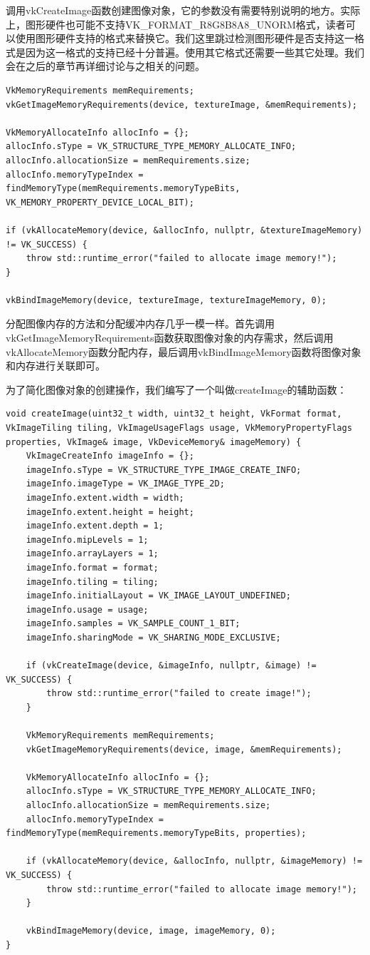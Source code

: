 \documentclass{ctexart}
\begin{document}
调用vkCreateImage函数创建图像对象，它的参数没有需要特别说明的地方。实际上，图形硬件也可能不支持VK\_FORMAT\_R8G8B8A8\_UNORM格式，读者可以使用图形硬件支持的格式来替换它。我们这里跳过检测图形硬件是否支持这一格式是因为这一格式的支持已经十分普遍。使用其它格式还需要一些其它处理。我们会在之后的章节再详细讨论与之相关的问题。

\begin{lstlisting}[language={[ANSI]C}]
VkMemoryRequirements memRequirements;
vkGetImageMemoryRequirements(device, textureImage, &memRequirements);

VkMemoryAllocateInfo allocInfo = {};
allocInfo.sType = VK_STRUCTURE_TYPE_MEMORY_ALLOCATE_INFO;
allocInfo.allocationSize = memRequirements.size;
allocInfo.memoryTypeIndex = findMemoryType(memRequirements.memoryTypeBits, VK_MEMORY_PROPERTY_DEVICE_LOCAL_BIT);

if (vkAllocateMemory(device, &allocInfo, nullptr, &textureImageMemory) != VK_SUCCESS) {
	throw std::runtime_error("failed to allocate image memory!");
}

vkBindImageMemory(device, textureImage, textureImageMemory, 0);
\end{lstlisting}

分配图像内存的方法和分配缓冲内存几乎一模一样。首先调用vkGetImageMemoryRequirements函数获取图像对象的内存需求，然后调用vkAllocateMemory函数分配内存，最后调用vkBindImageMemory函数将图像对象和内存进行关联即可。

为了简化图像对象的创建操作，我们编写了一个叫做createImage的辅助函数：

\begin{lstlisting}[language={[ANSI]C}]
void createImage(uint32_t width, uint32_t height, VkFormat format, VkImageTiling tiling, VkImageUsageFlags usage, VkMemoryPropertyFlags properties, VkImage& image, VkDeviceMemory& imageMemory) {
	VkImageCreateInfo imageInfo = {};
	imageInfo.sType = VK_STRUCTURE_TYPE_IMAGE_CREATE_INFO;
	imageInfo.imageType = VK_IMAGE_TYPE_2D;
	imageInfo.extent.width = width;
	imageInfo.extent.height = height;
	imageInfo.extent.depth = 1;
	imageInfo.mipLevels = 1;
	imageInfo.arrayLayers = 1;
	imageInfo.format = format;
	imageInfo.tiling = tiling;
	imageInfo.initialLayout = VK_IMAGE_LAYOUT_UNDEFINED;
	imageInfo.usage = usage;
	imageInfo.samples = VK_SAMPLE_COUNT_1_BIT;
	imageInfo.sharingMode = VK_SHARING_MODE_EXCLUSIVE;

	if (vkCreateImage(device, &imageInfo, nullptr, &image) != VK_SUCCESS) {
		throw std::runtime_error("failed to create image!");
	}

	VkMemoryRequirements memRequirements;
	vkGetImageMemoryRequirements(device, image, &memRequirements);

	VkMemoryAllocateInfo allocInfo = {};
	allocInfo.sType = VK_STRUCTURE_TYPE_MEMORY_ALLOCATE_INFO;
	allocInfo.allocationSize = memRequirements.size;
	allocInfo.memoryTypeIndex = findMemoryType(memRequirements.memoryTypeBits, properties);

	if (vkAllocateMemory(device, &allocInfo, nullptr, &imageMemory) != VK_SUCCESS) {
		throw std::runtime_error("failed to allocate image memory!");
	}

	vkBindImageMemory(device, image, imageMemory, 0);
}
\end{lstlisting}
\end{document}
